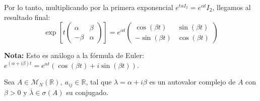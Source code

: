 Por lo tanto, multiplicando por la primera exponencial $e^{t\alpha I_2} = e^{\alpha t} I_2$, llegamos al resultado final:
\[
    \exp \left[ t \begin{pmatrix} \alpha & \beta \\ -\beta & \alpha \end{pmatrix} \right] = e^{\alpha t} \begin{pmatrix} \cos(\beta t) & \sin(\beta t) \\ -\sin(\beta t) & \cos(\beta t) \end{pmatrix}
\]

\textbf{Nota:} Esto es análogo a la fórmula de Euler: $e^{(\alpha + i\beta)t} = e^{\alpha t} (\cos(\beta t) + i \sin(\beta t))$.



Sea $A \in \mathcal{M}_N(\mathbb{R}), \ a_{ij} \in \mathbb{R}$, tal que $\lambda = \alpha + i\beta$ es un autovalor complejo de $A$ con $\beta > 0$ y $\overline{\lambda} \in \sigma(A)$ su conjugado.

